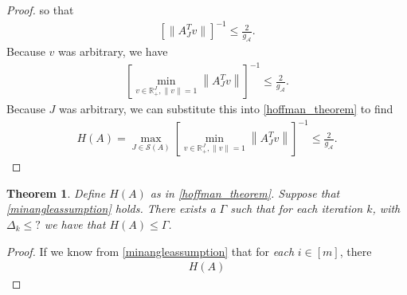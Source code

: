 \documentclass{article}
\newtheorem{theorem}{Theorem}[section]
\theoremstyle{case}
\numberwithin{theorem}{subsection}
\newcommand{\dk}{\Delta_k}
\newcommand{\minactivegrad}{{ g_{\mathcal A} }}
\newcommand{\xk}{x^{(k)}}
\newcommand{\xl}{{x^{(l)}}}
\newcommand{\projkl}{{p^{(k,l)}}}
\newcommand{\projkk}{{p^{(k,k)}}}
\newcommand{\activeprojkk}{{\mathbb P^{(k, k)}}}
\newcommand{\activeprojkl}{{\mathbb P^{(k, l)}}}
\begin{document}
\begin{proof}
so that 
\begin{align*}
\left[{\|A_J^Tv\|}\right]^{-1} \le \frac 2 {\minactivegrad}.
\end{align*}
Because $v$ was arbitrary, we have
\begin{align*}
\left[\min_{v \in \mathbb R^J_+, \|v\| = 1}  \left\|A_J^Tv\right\| \right]^{-1} \le \frac 2 {\minactivegrad}.
\end{align*}
Because $J$ was arbitrary, we can substitute this into \cref{hoffman_theorem} to find
\begin{align*}
H(A) = \max_{J \in \mathcal S(A)} \left[\min_{v \in \mathbb R^J_+, \|v\| = 1}  \left\|A_J^Tv\right\| \right]^{-1} \le \frac 2 {\minactivegrad}.
\end{align*}


\end{proof}


\begin{theorem}
\label{bounded_huffman_constant}
Define $H(A)$ as in \cref{hoffman_theorem}.
Suppose that \cref{minangleassumption} holds.
There exists a $\Gamma$ such that for each iteration $k$,
with $\dk \le ?$ we have that $H(A) \le \Gamma$.
\end{theorem}

\begin{proof}
If we know from \cref{minangleassumption} that for \emph{each} $i \in [m]$, there 
\begin{align*}
H(A)
\end{align*}
\end{proof}



\end{document}
